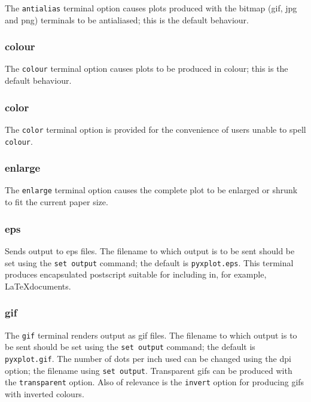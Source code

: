 The {\tt antialias} terminal option causes plots produced with the bitmap (gif,
jpg and png) terminals to be antialiased; this is the default behaviour.

\subsubsection{colour}

The {\tt colour} terminal option causes plots to be produced in colour; this is
the default behaviour.

\subsubsection{color}

The {\tt color} terminal option is provided for the convenience of users unable
to spell {\tt colour}.

\subsubsection{enlarge}

The {\tt enlarge} terminal option causes the complete plot to be enlarged or
shrunk to fit the current paper size.

\subsubsection{eps}

Sends output to eps files.  The filename to which output is to be sent should
be set using the {\tt set output} command; the default is
{\tt pyxplot.eps}.  This terminal produces encapsulated postscript
suitable for including in, for example, \LaTeX documents.


\subsubsection{gif}

The {\tt gif} terminal renders output as gif files. The filename to which output
is to be sent should be set using the {\tt set output} command; the default is
{\tt pyxplot.gif}. The number of dots per inch used can be changed using the dpi
option; the filename using {\tt set output}. Transparent gifs can be produced
with the {\tt transparent} option. Also of relevance is the {\tt invert} option
for producing gifs with inverted colours.



